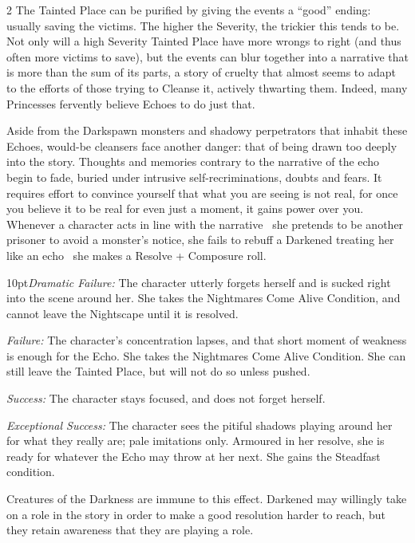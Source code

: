 \begin{multicols}{2}
The Tainted Place can be purified by giving the events a “good” ending: usually saving the victims. The higher the Severity, the trickier this tends to be. Not only will a high Severity Tainted Place have more wrongs to right (and thus often more victims to save), but the events can blur together into a narrative that is more than the sum of its parts, a story of cruelty that almost seems to adapt to the efforts of those trying to Cleanse it, actively thwarting them. Indeed, many Princesses fervently believe Echoes to do just that.

Aside from the Darkspawn monsters and shadowy perpetrators that inhabit these Echoes, would-be cleansers face another danger: that of being drawn too deeply into the story. Thoughts and memories contrary to the narrative of the echo begin to fade, buried under intrusive self-recriminations, doubts and fears. It requires effort to convince yourself that what you are seeing is not real, for once you believe it to be real for even just a moment, it gains power over you. Whenever a character acts in line with the narrative \textemdash\, she pretends to be another prisoner to avoid a monster's notice, she fails to rebuff a Darkened treating her like an echo \textemdash\, she makes a Resolve + Composure roll.

 \begin{myindentpar}{10pt}\emph{Dramatic Failure:} The character utterly forgets herself and is sucked right into the scene around her. She takes the Nightmares Come Alive Condition, and cannot leave the Nightscape until it is resolved.

    \emph{Failure:} The character’s concentration lapses, and that short moment of weakness is enough for the Echo. She takes the Nightmares Come Alive Condition. She can still leave the Tainted Place, but will not do so unless pushed. 

    \emph{Success:}  The character stays focused, and does not forget herself.

    \emph{Exceptional Success:} The character sees the pitiful shadows playing around her for what they really are; pale imitations only. Armoured in her resolve, she is ready for whatever the Echo may throw at her next. She gains the Steadfast condition.
\end{myindentpar}

Creatures of the Darkness are immune to this effect. Darkened may willingly take on a role in the story in order to make a good resolution harder to reach, but they retain awareness that they are playing a role. 


\end{multicols}
